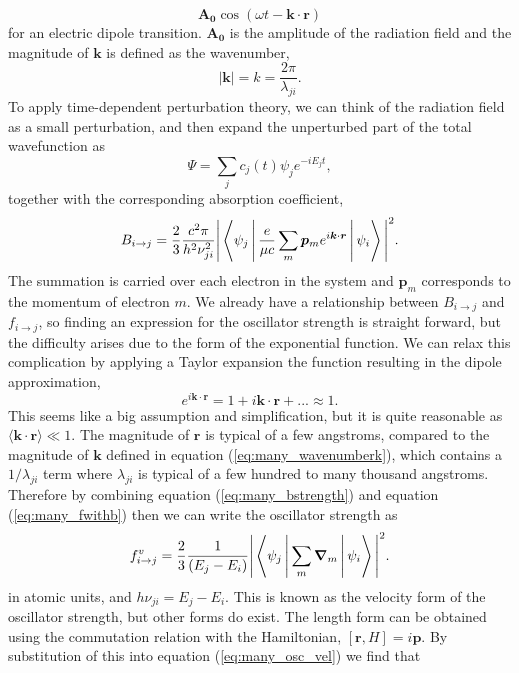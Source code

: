 \[
\boldsymbol{A_0}\cos(\omega t - \boldsymbol{k} \cdot \boldsymbol{r})
\] 
for an electric dipole transition. $\boldsymbol{A_0}$ is the amplitude of the radiation field and the magnitude of $\boldsymbol{k}$ is defined as the wavenumber,
\begin{equation}\label{eq:many_wavenumberk}
|\boldsymbol{k}| = k = \frac{2\pi}{\lambda_{ji}}.
\end{equation}
To apply time-dependent perturbation theory, we can think of the radiation field as a small perturbation, and then expand the unperturbed part of the total wavefunction as
\[
\Psi = \sum_j c_j(t) \psi_j e^{-iE_jt},
\]
together with the corresponding absorption coefficient,
\begin{equation}\label{eq:many_bstrength}
B_{i\rightarrow j} = \frac{2}{3}\frac{c^2 \pi}{h^2 \nu_{ji}^2} \Bigg | \Braket{\psi_j | \frac{e}{\mu c}\sum_m\boldsymbol{p}_me^{i\boldsymbol{k} \cdot \boldsymbol{r}} | \psi_i} \Bigg |^2.
\end{equation}
The summation is carried over each electron in the system and $\boldsymbol{p}_m$ corresponds to the momentum of electron $m$. We already have a relationship between $B_{i\rightarrow j}$ and $f_{i\rightarrow j}$, so finding an expression for the oscillator strength is straight forward, but the difficulty arises due to the form of the exponential function. We can relax this complication by applying a Taylor expansion the function resulting in the dipole approximation,
\[
e^{i\boldsymbol{k} \cdot \boldsymbol{r}} = 1 + i\boldsymbol{k} \cdot \boldsymbol{r} + ... \approx 1.
\]
This seems like a big assumption and simplification, but it is quite reasonable as $\langle \boldsymbol{k} \cdot \boldsymbol{r} \rangle \ll 1$. The magnitude of $\boldsymbol{r}$ is typical of a few angstroms, compared to the magnitude of $\boldsymbol{k}$ defined in equation (\ref{eq:many_wavenumberk}), which contains a $1/\lambda_{ji}$ term where $\lambda_{ji}$ is typical of a few hundred to many thousand angstroms. Therefore by combining equation (\ref{eq:many_bstrength}) and equation (\ref{eq:many_fwithb}) then we can write the oscillator strength as
\begin{equation}\label{eq:many_osc_vel}
f_{i\rightarrow j}^v = \frac{2}{3}\frac{1}{(E_j-E_i)} \Bigg | \Braket{\psi_j | \sum_m\boldsymbol{\nabla}_m | \psi_i} \Bigg |^2.
\end{equation}
in atomic units, and $h\nu_{ji} = E_j - E_i$. This is known as the velocity form of the oscillator strength, but other forms do exist. The length form can be obtained using the commutation relation with the Hamiltonian, $[\boldsymbol{r},H] = i\boldsymbol{p}$. By substitution of this into equation (\ref{eq:many_osc_vel}) we find that
